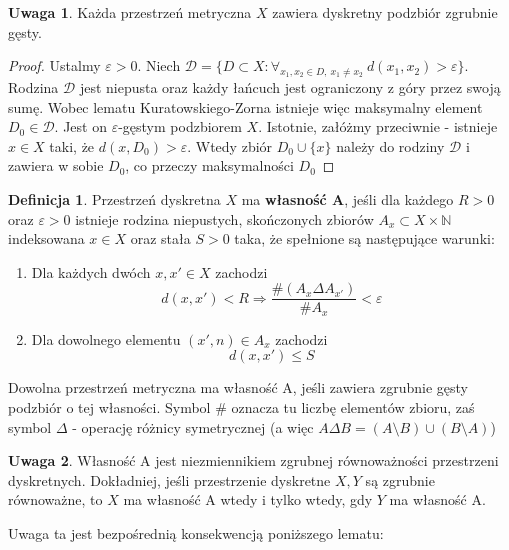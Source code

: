\documentclass[licencjacka]{pracamgr}
\theoremstyle{definition}
\newtheorem{definition}{Definicja}[section]
\theoremstyle{definition}
\newtheorem{remark}{Uwaga}[section]
\theoremstyle{definition}
\theoremstyle{definition}
\theoremstyle{definition}
\theoremstyle{plain}
\theoremstyle{plain}
\begin{document}
\begin{remark}\label{rem:densesubset}
	Każda przestrzeń metryczna $ X $ zawiera dyskretny podzbiór zgrubnie gęsty.
\end{remark}
\begin{proof}
	Ustalmy $ \varepsilon > 0 $. Niech $ \mathcal{D} = \{D \subset X : \forall_{x_1, x_2 \in D, ~
	x_1 \neq x_2} ~ d(x_1, x_2) > \varepsilon \} $. Rodzina $ \mathcal{D} $ jest niepusta 
	oraz każdy łańcuch jest ograniczony z góry przez swoją sumę. Wobec lematu 
	Kuratowskiego-Zorna istnieje więc maksymalny element $D_0 \in \mathcal{D}$. 
	Jest on $ \varepsilon $-gęstym podzbiorem $ X $. 
	Istotnie, załóżmy przeciwnie - istnieje $ x \in X $ taki, że 
	$ d(x, D_0) > \varepsilon $. Wtedy zbiór $ D_0 \cup \{x\} $ należy do rodziny 
	$ \mathcal{D} $ i zawiera w sobie $ D_0 $, co przeczy maksymalności $ D_0 $
\end{proof}

\begin{definition}\label{def:propA}
	Przestrzeń dyskretna $ X $ ma \textbf{własność A}, jeśli dla każdego $ R>0 $ oraz 
	$ \varepsilon > 0 $ istnieje rodzina niepustych, skończonych zbiorów $ A_x \subset 
	X \times \mathbb{N} $ indeksowana $ x \in X $ oraz stała $ S > 0 $ taka, że 
	spełnione są następujące warunki:
	\begin{enumerate}
		\item Dla każdych dwóch $ x,x' \in X $ zachodzi
		$$ d(x,x') < R \Rightarrow \frac{\# (A_x \Delta A_{x'})}{\# A_x} < \varepsilon$$
		\item Dla dowolnego elementu $(x', n) \in A_x$ zachodzi $$ d(x,x') \leq S $$
	\end{enumerate}
	Dowolna przestrzeń metryczna ma własność A, jeśli zawiera zgrubnie gęsty podzbiór 
	o tej własności. Symbol $ \# $ oznacza tu liczbę elementów zbioru, zaś symbol 
	$ \Delta $ - operację różnicy symetrycznej 
	(a więc $A \Delta B = (A \setminus B) \cup (B \setminus A)$)
\end{definition}

\begin{remark}
	Własność A jest niezmiennikiem zgrubnej równoważności przestrzeni dyskretnych. 
	Dokładniej, jeśli przestrzenie dyskretne $ X,Y $ są zgrubnie równoważne, to 
	$ X $ ma własność A wtedy i tylko wtedy, gdy $ Y $ ma własność A.
\end{remark}

Uwaga ta jest bezpośrednią konsekwencją poniższego lematu:
\end{document}
